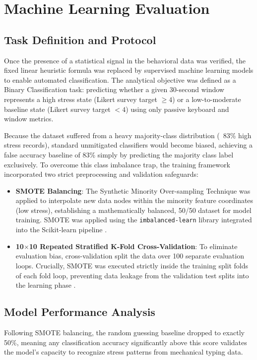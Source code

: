 \section{Machine Learning Evaluation}

\subsection{Task Definition and Protocol}
Once the presence of a statistical signal in the behavioral data was verified, the fixed linear heuristic formula was replaced by supervised machine learning models to enable automated classification. The analytical objective was defined as a Binary Classification task: predicting whether a given 30-second window represents a high stress state (Likert survey target $\ge 4$) or a low-to-moderate baseline state (Likert survey target $< 4$) using only passive keyboard and window metrics.

\noindent Because the dataset suffered from a heavy majority-class distribution (~83\% high stress records), standard unmitigated classifiers would become biased, achieving a false accuracy baseline of 83\% simply by predicting the majority class label exclusively. To overcome this class imbalance trap, the training framework incorporated two strict preprocessing and validation safeguards:
\begin{itemize}
    \item \textbf{SMOTE Balancing}: The Synthetic Minority Over-sampling Technique \cite{chawla2002smote} was applied to interpolate new data nodes within the minority feature coordinates (low stress), establishing a mathematically balanced, 50/50 dataset for model training. SMOTE was applied using the \texttt{imbalanced-learn} library integrated into the Scikit-learn pipeline \cite{scikitlearn}.
    \item \textbf{10$\times$10 Repeated Stratified K-Fold Cross-Validation}: To eliminate evaluation bias, cross-validation split the data over 100 separate evaluation loops. Crucially, SMOTE was executed strictly inside the training split folds of each fold loop, preventing data leakage from the validation test splits into the learning phase \cite{smoteLeakage}.
\end{itemize}

\subsection{Model Performance Analysis}
Following SMOTE balancing, the random guessing baseline dropped to exactly 50\%, meaning any classification accuracy significantly above this score validates the model's capacity to recognize stress patterns from mechanical typing data.

